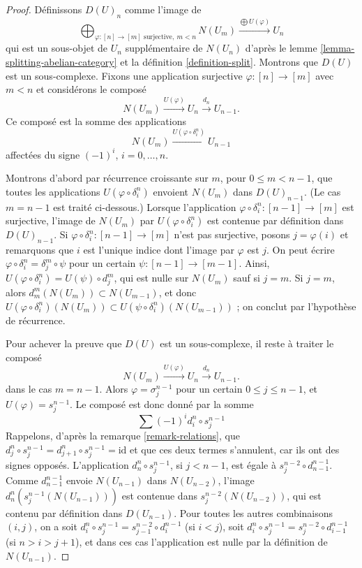 \begin{proof}
Définissons $D(U)_n$ comme l'image de
$$
\bigoplus\nolimits_{\varphi : [n] \to [m]\text{ surjective}, \ m < n} N(U_m)
\xrightarrow{\bigoplus U(\varphi)}
U_n
$$
qui est un sous-objet de $U_n$ supplémentaire de $N(U_n)$ d'après le
lemme \ref{lemma-splitting-abelian-category} et la définition
\ref{definition-split}. Montrons que $D(U)$ est un sous-complexe.
Fixons une application surjective $\varphi : [n] \to [m]$ avec $m < n$
et considérons le composé
$$
N(U_m) \xrightarrow{U(\varphi)} U_n \xrightarrow{d_n} U_{n - 1}.
$$
Ce composé est la somme des applications
$$
N(U_m) \xrightarrow{U(\varphi \circ \delta^n_i)} U_{n - 1}
$$
affectées du signe $(-1)^i$, $i = 0, \ldots, n$.

\medskip\noindent
Montrons d'abord par récurrence croissante sur $m$, pour
$0 \leq m < n - 1$, que toutes les applications
$U(\varphi \circ \delta^n_i)$ envoient $N(U_m)$ dans $D(U)_{n - 1}$.
(Le cas $m = n - 1$ est traité ci-dessous.) Lorsque l'application
$\varphi \circ \delta^n_i : [n - 1] \to [m]$ est surjective, l'image de
$N(U_m)$ par $U(\varphi \circ \delta^n_i)$ est contenue par définition
dans $D(U)_{n - 1}$. Si
$\varphi \circ \delta^n_i : [n - 1] \to [m]$ n'est pas surjective,
posons $j = \varphi(i)$ et remarquons que $i$ est l'unique indice dont
l'image par $\varphi$ est $j$. On peut écrire
$\varphi \circ \delta^n_i = \delta^m_j \circ \psi$
pour un certain $\psi : [n - 1] \to [m - 1]$. Ainsi,
$U(\varphi \circ \delta^n_i) = U(\psi) \circ d^m_j$,
qui est nulle sur $N(U_m)$ sauf si $j = m$. Si $j = m$, alors
$d^m_m(N(U_m)) \subset N(U_{m - 1})$, et donc
$U(\varphi \circ \delta^n_i)(N(U_m)) \subset
U(\psi \circ \delta^n_i)(N(U_{m - 1}))$ ; on conclut par l'hypothèse de
récurrence.

\medskip\noindent
Pour achever la preuve que $D(U)$ est un sous-complexe, il reste à traiter
le composé
$$
N(U_m) \xrightarrow{U(\varphi)} U_n \xrightarrow{d_n} U_{n - 1}.
$$
dans le cas $m =  n - 1$. Alors $\varphi = \sigma^{n - 1}_j$ pour un
certain $0 \leq j \leq n - 1$, et $U(\varphi) = s^{n - 1}_j$. Le composé
est donc donné par la somme
$$
\sum (-1)^i d^n_i \circ s^{n - 1}_j
$$
Rappelons, d'après la remarque \ref{remark-relations}, que
$d^n_j \circ s^{n - 1}_j = d^n_{j + 1} \circ s^{n - 1}_j = \text{id}$
et que ces deux termes s'annulent, car ils ont des signes opposés.
L'application $d^n_n \circ s^{n - 1}_j$, si $j < n - 1$, est égale à
$s^{n - 2}_j \circ d^{n - 1}_{n - 1}$. Comme
$d^{n - 1}_{n - 1}$ envoie $N(U_{n - 1})$ dans $N(U_{n - 2})$, l'image
$d^n_n ( s^{n - 1}_j (N(U_{n - 1})))$ est contenue dans
$s^{n - 2}_j(N(U_{n - 2}))$, qui est contenu par définition dans
$D(U_{n - 1})$. Pour toutes les autres combinaisons $(i, j)$, on a soit
$d^n_i \circ s^{n - 1}_j = s^{n - 2}_{j - 1} \circ d^{n - 1}_i$
(si $i < j$), soit
$d^n_i \circ s^{n - 1}_j = s^{n - 2}_j \circ d^{n - 1}_{i - 1}$
(si $n > i > j + 1$), et dans ces cas l'application est nulle par la
définition de $N(U_{n - 1})$.
\end{proof}

